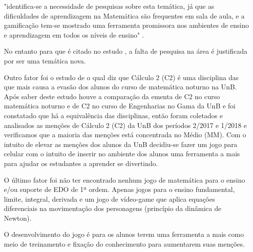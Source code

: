 \begin{citacao}"identifica-se a necessidade de pesquisas sobre esta temática, já que as dificuldades de aprendizagem na Matemática são frequentes em sala de aula, e a gamificação tem-se mostrado uma ferramenta promissora nos ambientes de ensino e aprendizagem em todos os níveis de ensino" \cite{revbibmatgam}. \end{citacao}




 No entanto para \cite{dicheva} que é citado no estudo \cite{revbibmatgam}, a falta de pesquisa na área é justificada por ser uma temática nova.

Outro fator foi o estudo de \cite{evasaoC2} o qual diz que Cálculo 2 (C2) é uma disciplina das que mais causa a evasão dos alunos do curso de matemática noturno na UnB. Após saber deste estudo houve a comparação da ementa de C2 no curso matemática noturno e de C2 no curso de Engenharias no Gama da UnB e foi constatado que há a equivalência das disciplinas, então foram coletados e analisados as menções de Cálculo 2 (C2) da UnB dos períodos 2/2017 e 1/2018 e verificamos que a maioria das menções está concentrada no Médio (MM). Com o intuito de elevar as menções dos alunos da UnB decidiu-se fazer um jogo para celular com o intuito de inserir no ambiente dos alunos uma ferramenta a mais para ajudar os estudantes a aprender se divertindo. 

O último fator foi não ter encontrado nenhum jogo de matemática para o ensino e/ou suporte de EDO de 1ª ordem. Apenas jogos para o ensino fundamental, limite, integral, derivada e um jogo de vídeo-game que aplica equações diferenciais na movimentação dos personagens (princípio da dinâmica de Newton)\cite{videoGameED}.

\begin{comment}
// //
O Brasil tem um dos piores índices de conhecimento em matemática \cite{indiceRuimMat}. Também tem o desânimo dos alunos e professores além da falta de estratégias inovadores por parte dos professores na hora de ensinar \cite{softwaregamificado}. Esse método de ensino tradicional, onde o professor é ativo e os alunos são apenas passivos para receber o conhecimento faz com que menos seja abstraído pelos alunos, que também precisam de práticas e um tempo de ócio criativo para abstrair e compreender o conteúdo de modo a repetir e aplicar em outras situações.
// //
\end{comment}
O desenvolvimento do jogo é para os alunos terem uma ferramenta a mais como meio de treinamento e fixação do conhecimento para aumentarem suas menções.

